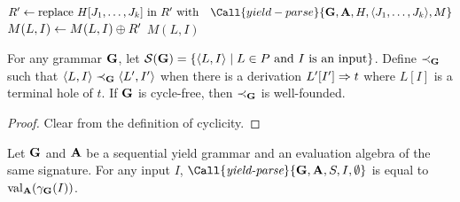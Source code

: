 \begin{algorithm}
\begin{algorithmic}[1]
                        \State \(R' \gets \text{replace } H[J_1, \ldots, J_k] \text{ in } R' \text{ with}\\
                            \hspace*{1em}\Call{yield-parse}{\gram, \alg, H, \tup{J_1, \ldots, J_k}\!, M}\)
                    \EndFor
                    \State \(M(L, I) \gets M(L, I) \algplus R'\)
                \EndFor
            \EndFor
            \State \Return \(M(L, I)\)
        \EndFunction
    \end{algorithmic}
    \caption[CYK-style parser for sequential yield grammars]{
        CYK-style parser for sequential yield grammars.
        \label{alg:seq-yield-parser}
    }
\end{algorithm}

\begin{lemma}
    For any grammar \(\gram\), let \(\mathcal{S}(\gram) = \{\tup{L, I} \mid L \in P \text{ and } I \text{ is an input}\}\).
    Define \(\prec_\gram\) such that \(\tup{L, I} \prec_\gram \tup{L', I'}\) when there is a derivation \(L'[I'] \gramrew t\) where \(L[I]\) is a terminal hole of \(t\).
    If \(\gram\) is cycle-free, then \(\prec_\gram\) is well-founded.
\end{lemma}
\begin{proof}
    Clear from the definition of cyclicity.
\end{proof}

\begin{theorem}\label{lem:yield-parse-validity}
    Let \(\gram\) and \(\alg\) be a sequential yield grammar and an evaluation algebra of the same signature.
    For any input \(I\), \(\Call{\emph{yield-parse}}{\gram, \alg, S, I, \emptyset}\) is equal to \(\algeval_\alg(\gramyield_\gram(I))\).
\end{theorem}


